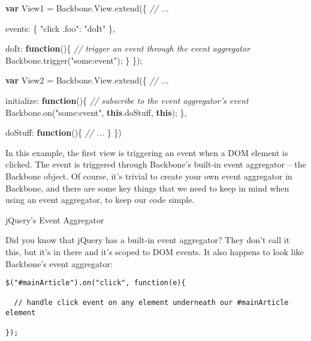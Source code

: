 \documentclass[9pt]{book}
\newenvironment{Shaded}{}{}
\newcommand{\KeywordTok}[1]{\textcolor[rgb]{0.00,0.44,0.13}{\textbf{{#1}}}}
\newcommand{\DataTypeTok}[1]{\textcolor[rgb]{0.56,0.13,0.00}{{#1}}}
\newcommand{\StringTok}[1]{\textcolor[rgb]{0.25,0.44,0.63}{{#1}}}
\newcommand{\CommentTok}[1]{\textcolor[rgb]{0.38,0.63,0.69}{\textit{{#1}}}}
\newcommand{\OtherTok}[1]{\textcolor[rgb]{0.00,0.44,0.13}{{#1}}}
\newcommand{\FunctionTok}[1]{\textcolor[rgb]{0.02,0.16,0.49}{{#1}}}
\newcommand{\NormalTok}[1]{{#1}}
\begin{document}
\begin{Shaded}
\begin{Highlighting}[]
\KeywordTok{var} \NormalTok{View1 = }\OtherTok{Backbone}\NormalTok{.}\OtherTok{View}\NormalTok{.}\FunctionTok{extend}\NormalTok{(\{}
  \CommentTok{// ...}

  \DataTypeTok{events}\NormalTok{: \{}
    \StringTok{"click .foo"}\NormalTok{: }\StringTok{"doIt"}
  \NormalTok{\},}

  \DataTypeTok{doIt}\NormalTok{: }\KeywordTok{function}\NormalTok{()\{}
    \CommentTok{// trigger an event through the event aggregator}
    \OtherTok{Backbone}\NormalTok{.}\FunctionTok{trigger}\NormalTok{(}\StringTok{"some:event"}\NormalTok{);}
  \NormalTok{\}}
\NormalTok{\});}

\KeywordTok{var} \NormalTok{View2 = }\OtherTok{Backbone}\NormalTok{.}\OtherTok{View}\NormalTok{.}\FunctionTok{extend}\NormalTok{(\{}
  \CommentTok{// ...}

  \DataTypeTok{initialize}\NormalTok{: }\KeywordTok{function}\NormalTok{()\{}
    \CommentTok{// subscribe to the event aggregator's event}
    \OtherTok{Backbone}\NormalTok{.}\FunctionTok{on}\NormalTok{(}\StringTok{"some:event"}\NormalTok{, }\KeywordTok{this}\NormalTok{.}\FunctionTok{doStuff}\NormalTok{, }\KeywordTok{this}\NormalTok{);}
  \NormalTok{\},}

  \DataTypeTok{doStuff}\NormalTok{: }\KeywordTok{function}\NormalTok{()\{}
    \CommentTok{// ...}
  \NormalTok{\}}
\NormalTok{\})}
\end{Highlighting}
\end{Shaded}

In this example, the first view is triggering an event when a DOM
element is clicked. The event is triggered through Backbone's built-in
event aggregator -- the Backbone object. Of course, it's trivial to
create your own event aggregator in Backbone, and there are some key
things that we need to keep in mind when using an event aggregator, to
keep our code simple.

jQuery's Event Aggregator

Did you know that jQuery has a built-in event aggregator? They don't
call it this, but it's in there and it's scoped to DOM events. It also
happens to look like Backbone's event aggregator:

\begin{verbatim}
$("#mainArticle").on("click", function(e){

  // handle click event on any element underneath our #mainArticle element

});
\end{verbatim}
\end{document}
